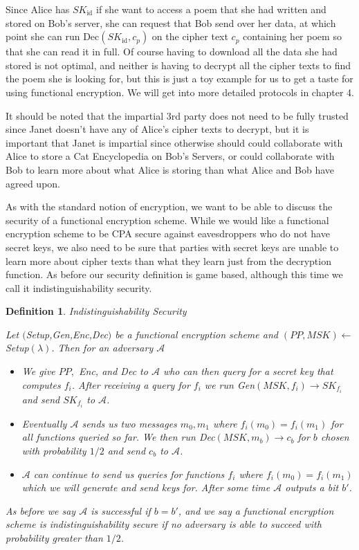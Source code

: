 \documentclass[12pt,twoside]{reedthesis}
\newtheorem{definition}{Definition}
\begin{document}
\par Since Alice has $SK_\text{id}$ if she want to access a poem that she had written and stored on Bob's server, she can request that Bob send over her data, at which point she can run Dec$(SK_\text{id}, c_p)$ on the cipher text $c_p$ containing her poem so that she can read it in full.  Of course having to download all the data she had stored is not optimal, and neither is having to decrypt all the cipher texts to find the poem she is looking for, but this is just a toy example for us to get a taste for using functional encryption. We will get into more detailed protocols in chapter 4.


\par It should be noted that the impartial 3rd party does not need to be fully trusted since Janet doesn't have any of Alice's cipher texts to decrypt, but it is important that Janet is impartial since otherwise should could collaborate with Alice to store a Cat Encyclopedia on Bob's Servers, or could collaborate with Bob to learn more about what Alice is storing than what Alice and Bob have agreed upon. 


\par As with the standard notion of encryption, we want to be able to discuss the security of a functional encryption scheme. While we would like a functional encryption scheme to be CPA secure against eavesdroppers who do not have secret keys, we also need to be sure that parties with secret keys are unable to learn more about cipher texts than what they learn just from  the decryption function. As before our security definition is game based, although this time we call it indistinguishability security.\\

\begin{definition}{Indistinguishability Security}
\par Let $($Setup,Gen,Enc,Dec$)$ be a functional encryption scheme and $(PP,MSK)\leftarrow$Setup$(\lambda)$. Then for an adversary $\mathcal{A}$ 
\begin{itemize}
\item We give $PP,$ Enc, and Dec to $\mathcal{A}$ who can then query for a secret key that computes $f_i$. After receiving a query for $f_i$ we run Gen$(MSK,f_i) \to SK_{f_i}$ and send $SK_{f_i}$ to $\mathcal{A}$.
\item Eventually $\mathcal{A}$ sends us two messages $m_0,m_1$ where $f_i(m_0)=f_i(m_1)$ for all functions queried so far. We then run Dec$(MSK,m_b)\to c_b$ for $b$ chosen with probability $1/2$ and send $c_b$ to $\mathcal{A}$.
\item $\mathcal{A}$ can continue to send us queries for functions $f_i$ where $f_i(m_0) = f_i(m_1)$ which we will generate and send keys for. After some time $\mathcal{A}$ outputs a bit $b'$.
\end{itemize}
\par As before we say $\mathcal{A}$ is successful if $b = b'$, and we say a functional encryption scheme is indistinguishability secure if no adversary is able to succeed with probability greater than $1/2$.
\end{definition}
\end{document}
